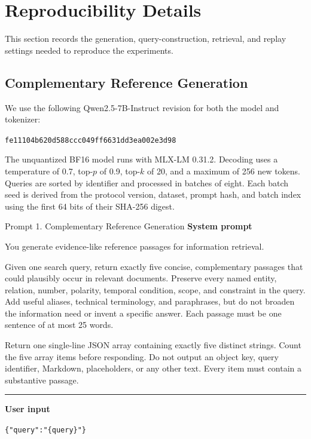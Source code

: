 \section{Reproducibility Details}
\label{sec:appendix-reproducibility}
\raggedbottom
\makeatletter
\setlength{\@fptop}{0pt}
\setlength{\@fpsep}{12pt plus 2pt minus 2pt}
\setlength{\@fpbot}{0pt plus 1fil}
\setlength{\@dblfptop}{0pt}
\setlength{\@dblfpsep}{12pt plus 2pt minus 2pt}
\setlength{\@dblfpbot}{0pt plus 1fil}
\makeatother

This section records the generation, query-construction, retrieval, and replay
settings needed to reproduce the experiments.

\subsection{Complementary Reference Generation}

We use the following Qwen2.5-7B-Instruct revision for both the model and
tokenizer:

{\footnotesize\noindent\texttt{fe11104b620d588ccc049ff6631dd3ea002e3d98}\par}

The unquantized BF16 model runs with MLX-LM 0.31.2. Decoding uses a
temperature of 0.7, top-$p$ of 0.9, top-$k$ of 20, and a maximum of 256 new
tokens. Queries are sorted by identifier and processed in batches of eight.
Each batch seed is derived from the protocol version, dataset, prompt hash, and
batch index using the first 64 bits of their SHA-256 digest.

\begin{promptbox}{Prompt 1. Complementary Reference Generation}
\textbf{System prompt}

You generate evidence-like reference passages for information retrieval.

Given one search query, return exactly five concise, complementary passages
that could plausibly occur in relevant documents. Preserve every named entity,
relation, number, polarity, temporal condition, scope, and constraint in the
query. Add useful aliases, technical terminology, and paraphrases, but do not
broaden the information need or invent a specific answer. Each passage must be
one sentence of at most 25 words.

Return one single-line JSON array containing exactly five distinct strings.
Count the five array items before responding. Do not output an object key,
query identifier, Markdown, placeholders, or any other text. Every item must
contain a substantive passage.

\par\smallskip\hrule\smallskip
\textbf{User input}\par
\texttt{\{"query":"\{query\}"\}}
\end{promptbox}

